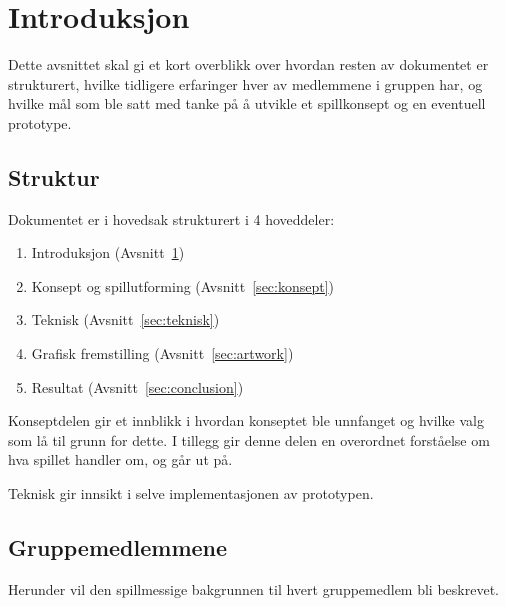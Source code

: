 \section{Introduksjon}\label{sec:intro}
Dette avsnittet skal gi et kort overblikk over hvordan resten av
dokumentet er strukturert, hvilke tidligere erfaringer hver av
medlemmene i gruppen har, og hvilke mål som ble satt med tanke på å
utvikle et spillkonsept og en eventuell prototype.

\subsection{Struktur}
Dokumentet er i hovedsak strukturert i 4 hoveddeler:
\begin{enumerate}
	\item Introduksjon (Avsnitt~\ref{sec:intro})
	\item Konsept og spillutforming (Avsnitt~\ref{sec:konsept})
	\item Teknisk (Avsnitt~\ref{sec:teknisk})
	\item Grafisk fremstilling (Avsnitt~\ref{sec:artwork})
	\item Resultat (Avsnitt~\ref{sec:conclusion})
\end{enumerate}
Konseptdelen gir et innblikk i hvordan konseptet ble unnfanget og hvilke
valg som lå til grunn for dette. I tillegg gir denne delen en overordnet
forståelse om hva spillet handler om, og går ut på.

Teknisk gir innsikt i selve implementasjonen av prototypen.

\subsection{Gruppemedlemmene}
Herunder vil den spillmessige bakgrunnen til hvert gruppemedlem bli
beskrevet.

